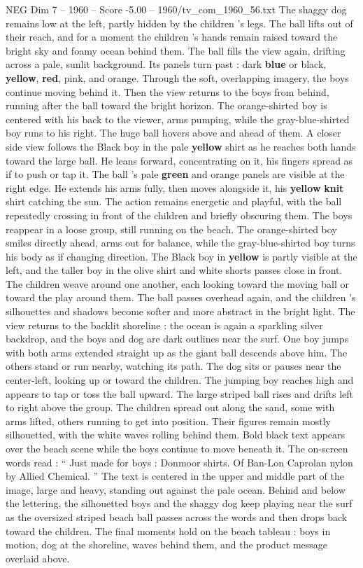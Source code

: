 \begin{textsample}{NEG Dim 7 – 1960 – Score -5.00 – 1960/tv\_com\_1960\_56.txt}
The shaggy dog remains low at the left, partly hidden by the children ’s legs.
The ball lifts out of their reach, and for a moment the children ’s hands remain raised toward the bright sky and foamy ocean behind them.
The ball fills the view again, drifting across a pale, sunlit background.
Its panels turn past : dark \textbf{blue} or black, \textbf{yellow}, \textbf{red}, pink, and orange.
Through the soft, overlapping imagery, the boys continue moving behind it.
Then the view returns to the boys from behind, running after the ball toward the bright horizon.
The orange-shirted boy is centered with his back to the viewer, arms pumping, while the gray-blue-shirted boy runs to his right.
The huge ball hovers above and ahead of them.
A closer side view follows the Black boy in the pale \textbf{yellow} shirt as he reaches both hands toward the large ball.
He leans forward, concentrating on it, his fingers spread as if to push or tap it.
The ball ’s pale \textbf{green} and orange panels are visible at the right edge.
He extends his arms fully, then moves alongside it, his \textbf{yellow} \textbf{knit} shirt catching the sun.
The action remains energetic and playful, with the ball repeatedly crossing in front of the children and briefly obscuring them.
The boys reappear in a loose group, still running on the beach.
The orange-shirted boy smiles directly ahead, arms out for balance, while the gray-blue-shirted boy turns his body as if changing direction.
The Black boy in \textbf{yellow} is partly visible at the left, and the taller boy in the olive shirt and white shorts passes close in front.
The children weave around one another, each looking toward the moving ball or toward the play around them.
The ball passes overhead again, and the children ’s silhouettes and shadows become softer and more abstract in the bright light.
The view returns to the backlit shoreline : the ocean is again a sparkling silver backdrop, and the boys and dog are dark outlines near the surf.
One boy jumps with both arms extended straight up as the giant ball descends above him.
The others stand or run nearby, watching its path.
The dog sits or pauses near the center-left, looking up or toward the children.
The jumping boy reaches high and appears to tap or toss the ball upward.
The large striped ball rises and drifts left to right above the group.
The children spread out along the sand, some with arms lifted, others running to get into position.
Their figures remain mostly silhouetted, with the white waves rolling behind them.
Bold black text appears over the beach scene while the boys continue to move beneath it.
The on-screen words read : “ Just made for boys : Donmoor shirts.
Of Ban-Lon Caprolan nylon by Allied Chemical. ” The text is centered in the upper and middle part of the image, large and heavy, standing out against the pale ocean.
Behind and below the lettering, the silhouetted boys and the shaggy dog keep playing near the surf as the oversized striped beach ball passes across the words and then drops back toward the children.
The final moments hold on the beach tableau : boys in motion, dog at the shoreline, waves behind them, and the product message overlaid above.

\end{textsample}
